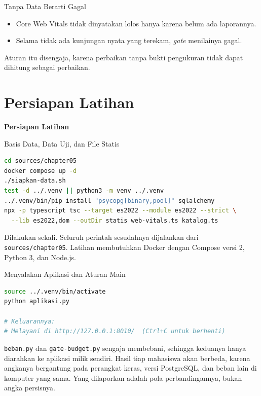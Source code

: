 \documentclass[aspectratio=169, table, 12pt]{beamer}
\begin{document}
\begin{frame}{{\Large Tanpa Data Berarti Gagal}}
  \vspace{14pt}
  \begin{itemize}
    \item Core Web Vitals tidak dinyatakan lolos hanya karena belum ada
          laporannya.
    \item Selama tidak ada kunjungan nyata yang terekam, \textit{gate} menilainya
          gagal.
  \end{itemize}
  \vspace{10pt}
  {\footnotesize Aturan itu disengaja, karena perbaikan tanpa bukti
  pengukuran tidak dapat dihitung sebagai perbaikan.}
\end{frame}

\section{Persiapan Latihan}

\begin{frame}{\hfill}
  \centering
  \Huge{\textbf{Persiapan Latihan}}
\end{frame}

\begin{frame}[fragile]{{\Large Basis Data, Data Uji, dan File Statis}}
  \vspace{2pt}
\begin{lstlisting}[language=bash]
cd sources/chapter05
docker compose up -d
./siapkan-data.sh
test -d ../.venv || python3 -m venv ../.venv
../.venv/bin/pip install "psycopg[binary,pool]" sqlalchemy
npx -p typescript tsc --target es2022 --module es2022 --strict \
  --lib es2022,dom --outDir statis web-vitals.ts katalog.ts
\end{lstlisting}
  \vspace{2pt}
  {\footnotesize Dilakukan sekali. Seluruh perintah sesudahnya dijalankan
  dari \texttt{sources/chapter05}. Latihan membutuhkan Docker dengan Compose
  versi 2, Python 3, dan Node.js.}
\end{frame}

\begin{frame}[fragile]{{\Large Menyalakan Aplikasi dan Aturan Main}}
  \vspace{2pt}
\begin{lstlisting}[language=bash]
source ../.venv/bin/activate
python aplikasi.py

# Keluarannya:
# Melayani di http://127.0.0.1:8010/  (Ctrl+C untuk berhenti)
\end{lstlisting}
  \vspace{4pt}
  {\footnotesize \texttt{beban.py} dan \texttt{gate-budget.py} sengaja
  membebani, sehingga keduanya hanya diarahkan ke aplikasi milik sendiri.
  Hasil tiap mahasiswa akan berbeda, karena angkanya bergantung pada
  perangkat keras, versi PostgreSQL, dan beban lain di komputer yang sama.
  Yang dilaporkan adalah pola perbandingannya, bukan angka persisnya.}
\end{frame}
\end{document}
